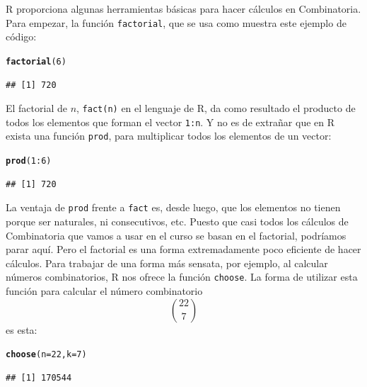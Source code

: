 \documentclass[10pt,a4paper]{article}\usepackage[]{graphicx}\usepackage[]{color}
\makeatletter
\newcommand{\hlnum}[1]{\textcolor[rgb]{0.686,0.059,0.569}{#1}}%
\newcommand{\hlopt}[1]{\textcolor[rgb]{0,0,0}{#1}}%
\newcommand{\hlstd}[1]{\textcolor[rgb]{0.345,0.345,0.345}{#1}}%
\newcommand{\hlkwc}[1]{\textcolor[rgb]{0.333,0.667,0.333}{#1}}%
\newcommand{\hlkwd}[1]{\textcolor[rgb]{0.737,0.353,0.396}{\textbf{#1}}}%
\newenvironment{kframe}{%
 \def\at@end@of@kframe{}%
 \ifinner\ifhmode%
  \def\at@end@of@kframe{\end{minipage}}%
  \begin{minipage}{\columnwidth}%
 \fi\fi%
 \def\FrameCommand##1{\hskip\@totalleftmargin \hskip-\fboxsep
 \colorbox{shadecolor}{##1}\hskip-\fboxsep
     \hskip-\linewidth \hskip-\@totalleftmargin \hskip\columnwidth}%
 \MakeFramed {\advance\hsize-\width
   \@totalleftmargin\z@ \linewidth\hsize
   \@setminipage}}%
 {\par\unskip\endMakeFramed%
 \at@end@of@kframe}
\newenvironment{knitrout}{}{} %
\makeatother
\begin{document}
      R proporciona algunas herramientas básicas para hacer cálculos en Combinatoria. Para empezar, la función {\tt factorial}, que se usa como muestra este ejemplo de código:
\begin{knitrout}
\color{fgcolor}\begin{kframe}
\begin{alltt}
\hlkwd{factorial}\hlstd{(}\hlnum{6}\hlstd{)}
\end{alltt}
\begin{verbatim}
## [1] 720
\end{verbatim}
\end{kframe}
\end{knitrout}
           El factorial de $n$, {\tt fact(n)} en el lenguaje de R, da como resultado el producto de todos los elementos que forman el vector {\tt 1:n}. Y no es de extrañar que en R exista una función {\tt prod}, para multiplicar todos los elementos de un vector:
\begin{knitrout}
\color{fgcolor}\begin{kframe}
\begin{alltt}
\hlkwd{prod}\hlstd{(}\hlnum{1}\hlopt{:}\hlnum{6}\hlstd{)}
\end{alltt}
\begin{verbatim}
## [1] 720
\end{verbatim}
\end{kframe}
\end{knitrout}
           La ventaja de {\tt prod} frente a {\tt fact} es, desde luego, que los elementos no tienen porque ser naturales, ni consecutivos, etc. Puesto que casi todos los cálculos de Combinatoria que vamos a usar en el curso se basan en el factorial, podríamos parar aquí. Pero el factorial es una forma extremadamente poco eficiente de hacer cálculos. Para trabajar de una forma más sensata, por ejemplo, al calcular números combinatorios, R nos ofrece la función {\tt choose}. La forma de utilizar esta función para  calcular el número combinatorio
      \[\binom{22}{7}\]
      es esta:
\begin{knitrout}
\color{fgcolor}\begin{kframe}
\begin{alltt}
\hlkwd{choose}\hlstd{(}\hlkwc{n}\hlstd{=}\hlnum{22}\hlstd{,}\hlkwc{k}\hlstd{=}\hlnum{7}\hlstd{)}
\end{alltt}
\begin{verbatim}
## [1] 170544
\end{verbatim}
\end{kframe}
\end{knitrout}
           
\end{document}
